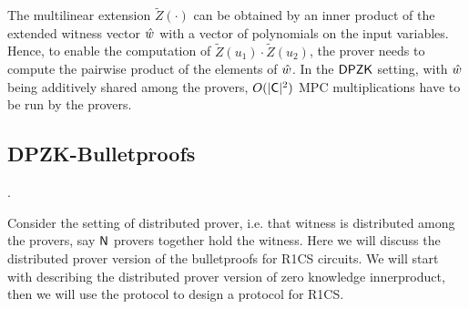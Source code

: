 The multilinear extension $\tilde{Z}(\cdot)$ can be obtained by an inner product of the extended witness vector $\hat{w}$ with a vector of polynomials on the input variables. Hence, to enable the computation of $\tilde{Z}(u_1) \cdot \tilde{Z}(u_2)$, the prover needs to compute the pairwise product of the elements of $\hat{w}$. In the $\mathsf{DPZK}$ setting, with $\hat{w}$ being additively shared among the provers, $O(|\mathsf{C}|^2)$ MPC multiplications have to be run by the provers. 

\subsection{DPZK-Bulletproofs}
.
\begin{comment}
We will give two constructions of distributed proof generation for R1CS with zero knowledge property. In the first construction we will start with reducing the proof for single prover R1CS to single prover zero knowledge inner product argument, then we will give a transformation for zero knwoledge inner product argument from single prover to multiple provers, which will directly imply the proof generation system for multiprover R1CS. In the second construction we will  
\end{comment}
Consider the setting of distributed prover, i.e. that witness is distributed among the provers, say $\mathsf{N}$ provers together hold the witness. Here we will discuss the distributed prover version of the bulletproofs for R1CS circuits. We will start with describing the distributed prover version of zero knowledge innerproduct, then we will use the protocol to design a protocol for R1CS.

